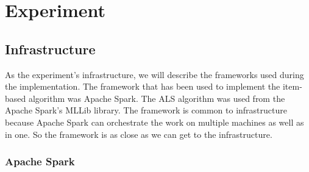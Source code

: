 \section{Experiment}
\subsection{Infrastructure}
As the experiment's infrastructure, we will describe the frameworks used during the implementation. The framework that has been used to implement the item-based algorithm was Apache Spark. The ALS algorithm was used from the Apache Spark's MLLib library. The framework is common to infrastructure because Apache Spark can orchestrate the work on multiple machines as well as in one. So the framework is as close as we can get to the infrastructure.

\subsubsection{Apache Spark}
%
%
%
